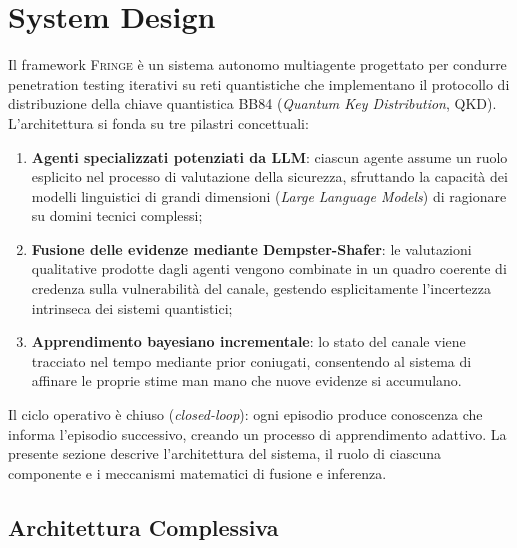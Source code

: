 
\chapter{System Design}
\label{ch:system-design}

Il framework \textsc{Fringe} è un sistema autonomo multiagente progettato per condurre penetration testing iterativi su reti quantistiche che implementano il protocollo di distribuzione della chiave quantistica BB84 (\emph{Quantum Key Distribution}, QKD). L'architettura si fonda su tre pilastri concettuali:

\begin{enumerate}
    \item \textbf{Agenti specializzati potenziati da LLM}: ciascun agente assume un ruolo esplicito nel processo di valutazione della sicurezza, sfruttando la capacità dei modelli linguistici di grandi dimensioni (\emph{Large Language Models}) di ragionare su domini tecnici complessi;
    
    \item \textbf{Fusione delle evidenze mediante Dempster-Shafer}: le valutazioni qualitative prodotte dagli agenti vengono combinate in un quadro coerente di credenza sulla vulnerabilità del canale, gestendo esplicitamente l'incertezza intrinseca dei sistemi quantistici;
    
    \item \textbf{Apprendimento bayesiano incrementale}: lo stato del canale viene tracciato nel tempo mediante prior coniugati, consentendo al sistema di affinare le proprie stime man mano che nuove evidenze si accumulano.
\end{enumerate}

Il ciclo operativo è chiuso (\emph{closed-loop}): ogni episodio produce conoscenza che informa l'episodio successivo, creando un processo di apprendimento adattivo. La presente sezione descrive l'architettura del sistema, il ruolo di ciascuna componente e i meccanismi matematici di fusione e inferenza.

\section{Architettura Complessiva}
\label{sec:overall-architecture}

